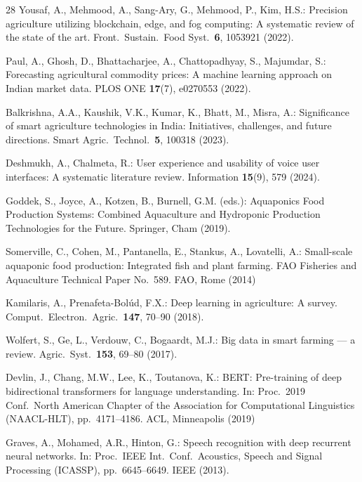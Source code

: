 \documentclass[runningheads]{llncs}
\begin{document}
\begin{thebibliography}{28}
Yousaf, A., Mehmood, A., Sang-Ary, G., Mehmood, P., Kim, H.S.:
Precision agriculture utilizing blockchain, edge, and fog computing:
A systematic review of the state of the art.
Front.\ Sustain.\ Food Syst.\ \textbf{6}, 1053921 (2022).

Paul, A., Ghosh, D., Bhattacharjee, A., Chattopadhyay, S.,
Majumdar, S.:
Forecasting agricultural commodity prices: A machine learning approach
on Indian market data.
PLOS ONE \textbf{17}(7), e0270553 (2022).

Balkrishna, A.A., Kaushik, V.K., Kumar, K., Bhatt, M., Misra, A.:
Significance of smart agriculture technologies in India: Initiatives,
challenges, and future directions.
Smart Agric.\ Technol.\ \textbf{5}, 100318 (2023).

Deshmukh, A., Chalmeta, R.:
User experience and usability of voice user interfaces: A systematic
literature review.
Information \textbf{15}(9), 579 (2024).

Goddek, S., Joyce, A., Kotzen, B., Burnell, G.M. (eds.):
Aquaponics Food Production Systems: Combined Aquaculture and
Hydroponic Production Technologies for the Future.
Springer, Cham (2019). 

Somerville, C., Cohen, M., Pantanella, E., Stankus, A., Lovatelli, A.:
Small-scale aquaponic food production: Integrated fish and plant farming.
FAO Fisheries and Aquaculture Technical Paper No.\ 589. FAO, Rome (2014)

Kamilaris, A., Prenafeta-Bol\'{u}d, F.X.:
Deep learning in agriculture: A survey.
Comput.\ Electron.\ Agric.\ \textbf{147}, 70--90 (2018).

Wolfert, S., Ge, L., Verdouw, C., Bogaardt, M.J.:
Big data in smart farming --- a review.
Agric.\ Syst.\ \textbf{153}, 69--80 (2017).

Devlin, J., Chang, M.W., Lee, K., Toutanova, K.:
BERT: Pre-training of deep bidirectional transformers for language
understanding. In: Proc.\ 2019 Conf.\ North American Chapter of the
Association for Computational Linguistics (NAACL-HLT), pp.\ 4171--4186.
ACL, Minneapolis (2019)

Graves, A., Mohamed, A.R., Hinton, G.:
Speech recognition with deep recurrent neural networks.
In: Proc.\ IEEE Int.\ Conf.\ Acoustics, Speech and Signal Processing
(ICASSP), pp.\ 6645--6649. IEEE (2013).


\end{thebibliography}
\end{document}

